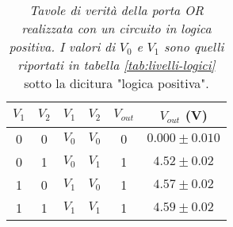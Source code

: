 \begin{table}[H]
  \centering
  \begin{tabular}[t]{c  c | c  c | c  c}
    \hline
    $V_{1}$ & $V_{2}$ & $V_{1}$ & $V_{2}$ & $V_{out}$ & $V_{out}$ (V) \\
    \hline
    0 & 0 & $V_{0}$ & $V_{0}$ & 0 & $0.000 \pm 0.010$ \\
    0 & 1 & $V_{0}$ & $V_{1}$ & 1 & $4.52 \pm 0.02$ \\
    1 & 0 & $V_{1}$ & $V_{0}$ & 1 & $4.57 \pm 0.02$ \\
    1 & 1 & $V_{1}$ & $V_{1}$ & 1 & $4.59 \pm 0.02$ \\
    \hline
  \end{tabular}
  \caption{\emph{Tavole di verità della porta \emph{OR} realizzata con un circuito in logica positiva. I valori di $V_{0}$ e $V_{1}$ sono quelli riportati in tabella \ref{tab:livelli-logici}} sotto la dicitura "logica positiva".}
  \label{tab:or-logicapositiva}
\end{table}
